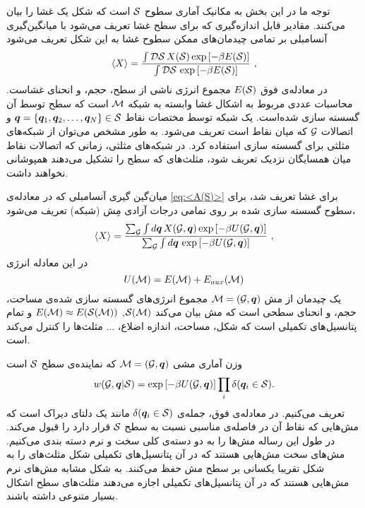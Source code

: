 توجه ما در این بخش به مکانیک آماری سطوح 
$\cal S$
است که شکل یک غشا را بیان می‌کنند. مقادیر قابل اندازه‌گیری که برای سطح غشا تعریف می‌شود با میانگین‌گیری آنسامبلی بر تمامی چیدمان‌های ممکن سطوح غشا به این شکل تعریف می‌شود
\begin{equation}\label{eq:<A(S)>}
\langle X \rangle = \frac{ \int {\cal D}{\cal S}\, X({\cal S}) \exp\left[-\beta E({\cal S})\right] } 
                                     { \int {\cal D}{\cal S}\,                  \exp\left[-\beta E({\cal S})\right] }\ ,
\end{equation}
در معادله‌ی فوق 
$E({\cal S})$
مجموع انرژی ناشی از سطح، حجم، و انحنای غشاست. محاسبات عددی مربوط به اشکال غشا وابسته به شبکه
$\cal M$
است که سطح توسط آن گسسته سازی شده‌است. یک شبکه توسط مختصات نقاط
$\bm q=\{\bm q_1,\bm q_2, \ldots, \bm q_N \} \in \cal S$
و اتصالات
$\cal G$
که میان نقاط است تعریف می‌شود. به طور مشخص می‌توان از شبکه‌های‌ مثلثی برای گسسته سازی استفاده کرد. در شبکه‌های مثلثی، زمانی که اتصالات نقاط میان همسایگان نزدیک تعریف شود، مثلث‌های که سطح را تشکیل می‌دهند همپوشانی نخواهند داشت.

میان‌گین گیری آنسامبلی که در معادله‌ی 
\ref{eq:<A(S)>}
برای غشا تعریف شد، برای سطوح گسسته سازی شده بر روی تمامی درجات آزادی مِش (شبکه) تعریف می‌شود،
\begin{equation}\label{eq:<A(M)>}
\langle X \rangle = \frac{ \sum_{\cal G}\int d {\bm q}\, X({\cal G}, {\bm q}) \exp\left[-\beta U({\cal G}, {\bm q})\right] } 
                                     { \sum_{\cal G}\int d {\bm q}\,                                \exp\left[-\beta U({\cal G}, {\bm q})\right] }\ ,
\end{equation}
در این معادله انرژی
\begin{equation}
U({\cal M}) = E({\cal M}) + E_{aux}({\cal M})
\end{equation}
یک چیدمان از مش
 ${\cal M} = ({\cal G},\bm q)$
مجموع انرژی‌های گسسته سازی شده‌ی مساحت، حجم، و انحنای سطحی است که مش بیان می‌کند
$\cal S(\cal M)$,  $E({\cal M}) \approx E(\cal S(\cal M))$
و تمام پتانسیل‌های تکمیلی است که شکل، مساحت، اندازه اضلاع، ... مثلث‌ها را کنترل می‌کند است.

وزن آماری مشی
${\cal M} = ({\cal G},\bm q)$
که نماینده‌ی سطح
 $\cal S$
است
\begin{equation}\label{eq:w(M) for given S}
w({\cal G}, {\bm q}|{\cal S}) = \exp\left[-\beta U({\cal G}, {\bm q})\right] \prod_i \delta({\bm q}_i\in {\cal S}).
\end{equation}
تعریف می‌کنیم. در معادله‌ی فوق، جمله‌ی
 $\delta({\bm q}_i\in {\cal S})$
مانند یک دلتای دیراک است که مش‌هایی که نقاط آن در فاصله‌ی مناسبی نسبت به سطح 
 $\cal S$
قرار دارد را قبول می‌کند. در طول این رساله مش‌ها را به دو دسته‌ی کلی سخت و نرم دسته بندی می‌کنیم. مش‌های سخت مش‌هایی هستند که در آن پتانسیل‌های تکمیلی شکل مثلث‌های را به شکل تقریبا یکسانی بر سطح مش حفظ می‌کنند. به شکل مشابه مش‌های نرم مش‌هایی هستند که در آن پتانسیل‌های تکمیلی اجازه‌ می‌دهند مثلث‌های سطح اشکال بسیار متنوعی داشته باشند. 

